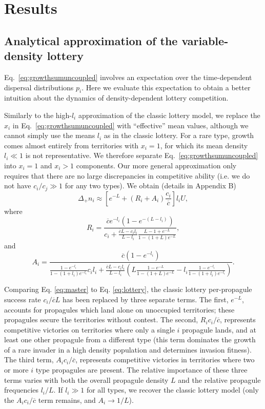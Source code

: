 \documentclass[12pt]{article}
\begin{document}
\section*{Results}

\subsection*{Analytical approximation of the variable-density lottery}

Eq.~\eqref{eq:growthsumuncoupled} involves an expectation over the time-dependent dispersal distributions $p_i$. Here we evaluate this expectation to obtain a better intuition about the dynamics of density-dependent lottery competition. 

Similarly to the high-$l_i$ approximation of the classic lottery model, we replace the $x_i$ in Eq.~\eqref{eq:growthsumuncoupled} with ``effective'' mean values, although we cannot simply use the means $l_i$ as in the classic lottery. For a rare type, growth comes almost entirely from territories with $x_i=1$, for which its mean density $l_i\ll 1$ is not representative. We therefore separate Eq.~\eqref{eq:growthsumuncoupled} into $x_i=1$ and $x_i>1$ components. Our more general approximation only requires that there are no large discrepancies in competitive ability (i.e. we do not have $c_i/c_j\gg 1$ for any two types). We obtain (details in Appendix B)
\begin{equation}
\Delta_+ n_i\approx \left[e^{-L}+(R_i+A_i)\frac{c_i}{\overline{c}}\right]l_i U, \label{eq:master}
\end{equation}
where
\begin{equation}
R_i=\frac{\overline{c}e^{-l_i}(1-e^{-(L-l_i)})}{c_i +\frac{\overline{c}L- c_il_i}{L-l_i}\frac{L-1+e^{-L}}{1-(1+L)e^{-L}}},\nonumber \label{eq:Dr}
\end{equation}
and
\begin{equation}
A_i=\frac{\overline{c}(1-e^{-l_i})}{\frac{1-e^{-l_i}}{1-(1+l_i)e^{-l_i}}c_il_i+\frac{\overline{c}L- c_il_i}{L-l_i}\left(L\frac{1-e^{-L}}{1-(1+L)e^{-L}}-l_i\frac{1-e^{-l_i}}{1-(1+l_i)e^{-l_i}}\right)}. \nonumber \label{eq:Da}
\end{equation}

Comparing Eq. \eqref{eq:master} to Eq. \eqref{eq:lottery}, the classic lottery per-propagule success rate $c_i/\overline{c}L$ has been replaced by three separate terms. The first, $e^{-L}$, accounts for propagules which land alone on unoccupied territories; these propagules secure the territories without contest. The second, $R_i c_i/\overline{c}$, represents competitive victories on territories where only a single $i$ propagule lands, and at least one other propagule from a different type (this term dominates the growth of a rare invader in a high density population and determines invasion fitness). The third term, $A_i c_i/\overline{c}$, represents competitive victories in territories where two or more $i$ type propagules are present. The relative importance of these three terms varies with both the overall propagule density $L$ and the relative propagule frequencies $l_i/L$. If $l_i\gg 1$ for all types, we recover the classic lottery model (only the $A_ic_i/\overline{c}$ term remains, and $A_i\rightarrow 1/L$). 
\end{document}
